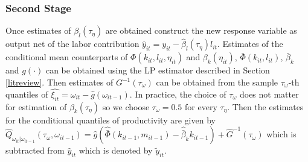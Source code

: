 \documentclass[11pt]{article}
\begin{document}
\subsubsection*{Second Stage}
Once estimates of $\beta_{l}(\tau_{\eta})$ are obtained construct the new response variable as output net of the labor contribution $\hat{y}_{it}=y_{it}-\hat{\beta}_{l}(\tau_{\eta})l_{it}$. Estimates of the conditional mean counterparts of $\Phi(k_{it}, l_{it}, \eta_{it})$ and $\beta_{k}(\eta_{it})$, $\bar{\Phi}(k_{it}, l_{it})$, $\bar{\beta}_{k}$ and $g(\cdot)$ can be obtained using the LP estimator described in Section \ref{litreview}. Then estimates of $G^{-1}(\tau_{\omega})$ can be obtained from the sample $\tau_{\omega}$-th quantiles of $\hat{\xi_{it}}=\omega_{it}-\hat{g}(\omega_{it-1})$. In practice, the choice of $\tau_{\omega}$ does not matter for estimation of $\beta_{k}(\tau_{\eta})$ so we choose $\tau_{\omega}=0.5$ for every $\tau_{\eta}$. Then the estimates for the conditional quantiles of productivity are given by $\hat{Q}_{\omega_{it}|\omega_{it-1}}(\tau_{\omega}, \omega_{it-1})=\hat{g}(\hat{\bar{\Phi}}(k_{it-1}, m_{it-1})-\hat{\bar{\beta}}_{k}k_{it-1})+\hat{G}^{-1}(\tau_{\omega})$ which is subtracted from $\hat{y}_{it}$ which is denoted by $\tilde{y}_{it}$.
\end{document}
